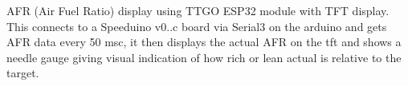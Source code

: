 AFR (Air Fuel Ratio) display using TTGO ESP32 module with TFT display. This connects to a Speeduino v0..\+c board via Serial3 on the arduino and gets AFR data every 50 msc, it then displays the actual AFR on the tft and shows a needle gauge giving visual indication of how rich or lean actual is relative to the target. 